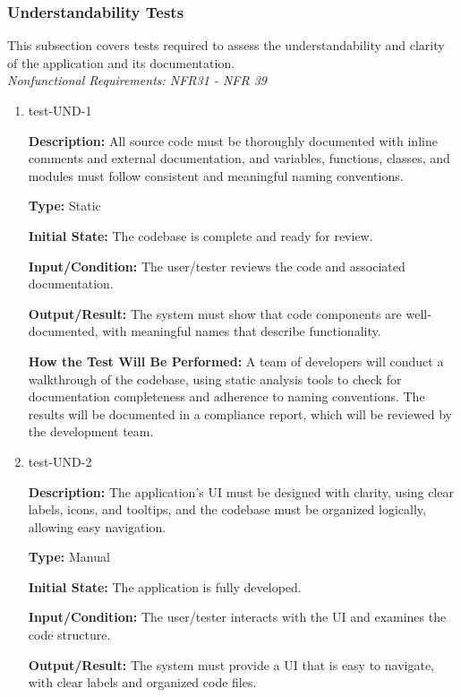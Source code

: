 \documentclass[12pt, titlepage]{article}
\begin{document}
\subsubsection{Understandability Tests}

This subsection covers tests required to assess the understandability and clarity of the application and its documentation. \\
\textit{Nonfunctional Requirements: NFR31 - NFR 39}

\begin{enumerate}

\item{test-UND-1\\}

\textbf{Description:} All source code must be thoroughly documented with inline comments and external documentation, and variables, functions, classes, and modules must follow consistent and meaningful naming conventions.

\textbf{Type:} Static
					
\textbf{Initial State:} The codebase is complete and ready for review.
					
\textbf{Input/Condition:} The user/tester reviews the code and associated documentation.
					
\textbf{Output/Result:} The system must show that code components are well-documented, with meaningful names that describe functionality.
					
\textbf{How the Test Will Be Performed:} A team of developers will conduct a walkthrough of the codebase, using static analysis tools to check for documentation completeness and adherence to naming conventions. The results will be documented in a compliance report, which will be reviewed by the development team.

\item{test-UND-2\\}

\textbf{Description:} The application’s UI must be designed with clarity, using clear labels, icons, and tooltips, and the codebase must be organized logically, allowing easy navigation.

\textbf{Type:} Manual
					
\textbf{Initial State:} The application is fully developed.
					
\textbf{Input/Condition:} The user/tester interacts with the UI and examines the code structure.
					
\textbf{Output/Result:} The system must provide a UI that is easy to navigate, with clear labels and organized code files.
					

\end{enumerate}
\end{document}
